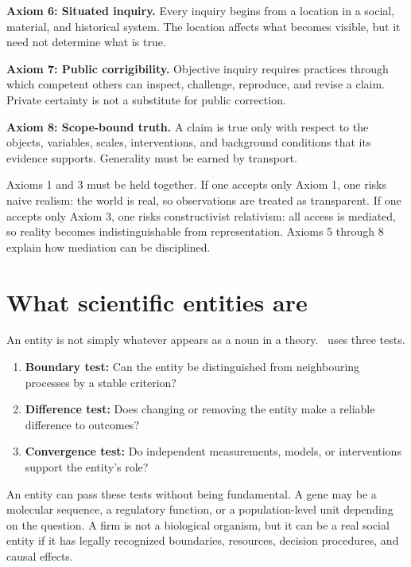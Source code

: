 \begin{principlebox}
\textbf{Axiom 6: Situated inquiry.} Every inquiry begins from a location in a
social, material, and historical system. The location affects what becomes
visible, but it need not determine what is true.
\end{principlebox}

\begin{principlebox}
\textbf{Axiom 7: Public corrigibility.} Objective inquiry requires practices
through which competent others can inspect, challenge, reproduce, and revise a
claim. Private certainty is not a substitute for public correction.
\end{principlebox}

\begin{principlebox}
\textbf{Axiom 8: Scope-bound truth.} A claim is true only with respect to the
objects, variables, scales, interventions, and background conditions that its
evidence supports. Generality must be earned by transport.
\end{principlebox}

Axioms 1 and 3 must be held together. If one accepts only Axiom 1, one risks
naive realism: the world is real, so observations are treated as transparent.
If one accepts only Axiom 3, one risks constructivist relativism: all access is
mediated, so reality becomes indistinguishable from representation. Axioms 5
through 8 explain how mediation can be disciplined.

\section{What scientific entities are}

An entity is not simply whatever appears as a noun in a theory. \RCR\ uses
three tests.

\begin{enumerate}
\item \textbf{Boundary test:} Can the entity be distinguished from neighbouring
processes by a stable criterion?
\item \textbf{Difference test:} Does changing or removing the entity make a
reliable difference to outcomes?
\item \textbf{Convergence test:} Do independent measurements, models, or
interventions support the entity's role?
\end{enumerate}

An entity can pass these tests without being fundamental. A gene may be a
molecular sequence, a regulatory function, or a population-level unit depending
on the question. A firm is not a biological organism, but it can be a real
social entity if it has legally recognized boundaries, resources, decision
procedures, and causal effects.

